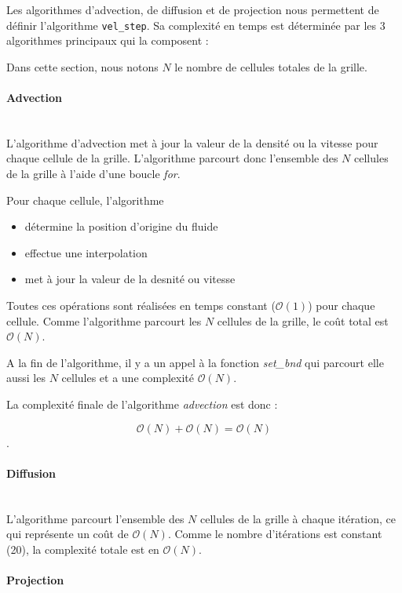 \documentclass[a4paper]{article}
\begin{document}
Les algorithmes d'advection, de diffusion et de projection nous permettent de définir l'algorithme 
\texttt{vel\_step}. Sa complexité en temps est déterminée par les 3 algorithmes principaux qui la composent :

    Dans cette section, nous notons $N$ le nombre de cellules totales de la grille.
\paragraph{Advection}
\leavevmode\\

L'algorithme d'advection met à jour la valeur de la densité ou la vitesse pour chaque 
cellule de la grille. L'algorithme parcourt donc l'ensemble des
$N$ cellules de la grille à l'aide d'une 
boucle \emph{for}.

Pour chaque cellule, l'algorithme
\begin{itemize}
    \item détermine la position d'origine du fluide
    \item effectue une interpolation
    \item met à jour la valeur de la desnité ou vitesse
\end{itemize}
Toutes ces opérations sont réalisées en temps constant 
($\mathcal{O}(1)$) pour chaque cellule. 
Comme l'algorithme parcourt les $N$ cellules de la grille, 
le coût total est $\mathcal{O}(N)$.

A la fin de l'algorithme, il y a un appel à la fonction
\emph{set\_bnd} qui parcourt elle
aussi les $N$ cellules et a une complexité
  $\mathcal{O}(N)$.

La complexité finale de l'algorithme \emph{advection} est donc : 

$$\mathcal{O}(N) + \mathcal{O}(N) = \mathcal{O}(N)$$.

\paragraph{Diffusion}
\leavevmode\\

L'algorithme parcourt l'ensemble
des $N$ cellules de la grille à chaque itération,
 ce qui représente un coût de $\mathcal{O}(N)$.
Comme le nombre d'itérations est constant (20), 
la complexité totale est en $\mathcal{O}(N)$.


\paragraph{Projection}
\leavevmode\\
\end{document}
